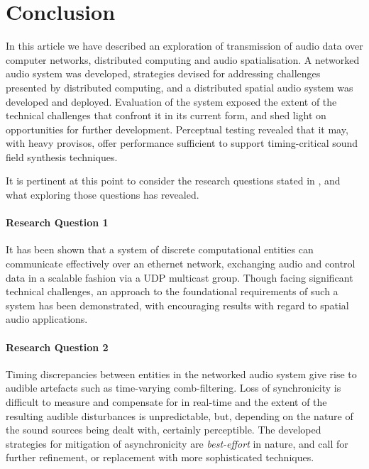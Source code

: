 \section{Conclusion}\label{sec:conclusion}


In this article we have described an exploration of transmission of audio data
over computer networks, distributed computing and audio spatialisation.
A networked audio system was developed, strategies devised for
addressing challenges presented by distributed computing, and a distributed
spatial audio system was developed and deployed.
Evaluation of the system exposed the extent of the technical challenges
that confront it in its current form, and shed light on opportunities for
further development.
Perceptual testing revealed that it may, with heavy provisos, offer performance
sufficient to support timing-critical sound field synthesis techniques.

It is pertinent at this point to consider the research questions stated in
\secref{}, and what exploring those questions has
revealed.

\paragraph{Research Question 1}
It has been shown that a system of discrete computational entities can
communicate effectively over an ethernet network, exchanging audio and control
data in a scalable fashion via a UDP multicast group.
Though facing significant technical challenges, an approach to the foundational
requirements of such a system has been demonstrated, with encouraging results
with regard to spatial audio applications.

\paragraph{Research Question 2}
Timing discrepancies between entities in the networked audio system give rise
to audible artefacts such as time-varying comb-filtering.
Loss of synchronicity is difficult to measure and compensate for in real-time
and the extent of the resulting audible disturbances is unpredictable, but,
depending on the nature of the sound sources being dealt with,
certainly perceptible.
The developed strategies for mitigation of asynchronicity are
\textit{best-effort} in nature, and call for further refinement, or replacement
with more sophisticated techniques.

